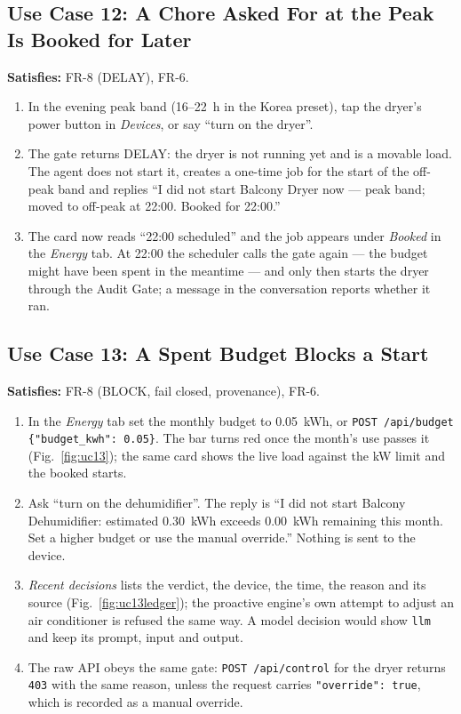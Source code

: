 \documentclass[conference]{IEEEtran}
\begin{document}
\subsection{Use Case 12: A Chore Asked For at the Peak Is Booked for Later}
\textbf{Satisfies:} FR-8 (DELAY), FR-6.
\begin{enumerate}
    \item In the evening peak band (16--22~h in the Korea preset), tap the dryer's power button in \emph{Devices}, or say ``turn on the dryer''.
    \item The gate returns DELAY: the dryer is not running yet and is a movable load. The agent does not start it, creates a one-time job for the start of the off-peak band and replies ``I did not start Balcony Dryer now --- peak band; moved to off-peak at 22:00. Booked for 22:00.''
    \item The card now reads ``22:00 scheduled'' and the job appears under \emph{Booked} in the \emph{Energy} tab. At 22:00 the scheduler calls the gate again --- the budget might have been spent in the meantime --- and only then starts the dryer through the Audit Gate; a message in the conversation reports whether it ran.
\end{enumerate}

\subsection{Use Case 13: A Spent Budget Blocks a Start}
\textbf{Satisfies:} FR-8 (BLOCK, fail closed, provenance), FR-6.
\begin{enumerate}
    \item In the \emph{Energy} tab set the monthly budget to 0.05~kWh, or \texttt{POST /api/budget \{"budget\_kwh": 0.05\}}. The bar turns red once the month's use passes it (Fig.~\ref{fig:uc13}); the same card shows the live load against the kW limit and the booked starts.
    \item Ask ``turn on the dehumidifier''. The reply is ``I did not start Balcony Dehumidifier: estimated 0.30~kWh exceeds 0.00~kWh remaining this month. Set a higher budget or use the manual override.'' Nothing is sent to the device.
    \item \emph{Recent decisions} lists the verdict, the device, the time, the reason and its source (Fig.~\ref{fig:uc13ledger}); the proactive engine's own attempt to adjust an air conditioner is refused the same way. A model decision would show \texttt{llm} and keep its prompt, input and output.
    \item The raw API obeys the same gate: \texttt{POST /api/control} for the dryer returns \texttt{403} with the same reason, unless the request carries \texttt{"override": true}, which is recorded as a manual override.
\end{enumerate}
\end{document}
